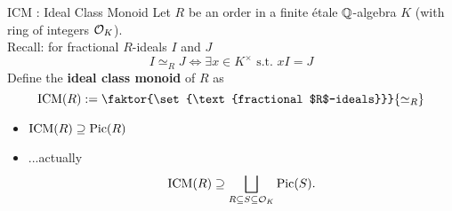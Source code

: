 \documentclass{beamer}
\begin{document}
% 
% 

\begin{frame}{ICM : Ideal Class Monoid}
Let $R$ be an order in a finite \'etale  $\mathbb{Q}$-algebra $K$ (with ring of integers ${\mathcal O}_K$).\\
\pause Recall: for fractional $R$-ideals $I$ and $J$
\[ I\simeq_R J \Longleftrightarrow \exists x \in K^\times \text{ s.t.~} xI=J \]
\pause Define the \textbf{ideal class monoid} of $R$ as
\[\ICM(R) := \faktor{\set{\text{fractional $R$-ideals}}}{\simeq_R}\]
\begin{itemize}
\pause \item\mbox{}\vspace{-5mm} \begin{center} $\operatorname{ICM}(R)\supseteq \operatorname{Pic}(R)$ \end{center}
\pause \item  ...actually
\[\operatorname{ICM}(R) \supseteq \bigsqcup_{R\subseteq S \subseteq {\mathcal O}_K} \operatorname{Pic}(S).\]
\end{itemize}
\end{frame}
\end{document}
